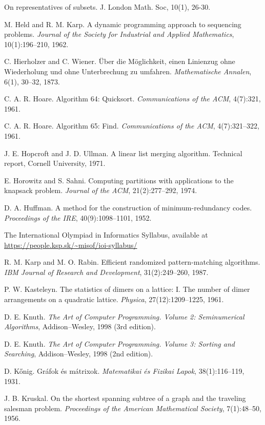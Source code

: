 \begin{thebibliography}{9}
  On representatives of subsets. J. London Math. Soc, 10(1), 26-30.

  M. Held and R. M. Karp.
  A dynamic programming approach to sequencing problems.
  \emph{Journal of the Society for Industrial and Applied Mathematics}, 10(1):196--210, 1962.

  C. Hierholzer and C. Wiener.
  Über die Möglichkeit, einen Linienzug ohne Wiederholung und ohne Unterbrechung zu umfahren.
  \emph{Mathematische Annalen}, 6(1), 30--32, 1873.

  C. A. R. Hoare.
  Algorithm 64: Quicksort.
  \emph{Communications of the ACM}, 4(7):321, 1961.

  C. A. R. Hoare.
  Algorithm 65: Find.
  \emph{Communications of the ACM}, 4(7):321--322, 1961.

  J. E. Hopcroft and J. D. Ullman.
  A linear list merging algorithm.
  Technical report, Cornell University, 1971.

  E. Horowitz and S. Sahni.
  Computing partitions with applications to the knapsack problem.
  \emph{Journal of the ACM}, 21(2):277--292, 1974.

  D. A. Huffman.
  A method for the construction of minimum-redundancy codes.
  \emph{Proceedings of the IRE}, 40(9):1098--1101, 1952.

  The International Olympiad in Informatics Syllabus, available at
  \url{https://people.ksp.sk/~misof/ioi-syllabus/}

  R. M. Karp and M. O. Rabin.
  Efficient randomized pattern-matching algorithms.
  \emph{IBM Journal of Research and Development}, 31(2):249--260, 1987.

  P. W. Kasteleyn.  
  The statistics of dimers on a lattice: I. The number of dimer arrangements on a quadratic lattice.
  \emph{Physica}, 27(12):1209--1225, 1961.

  D. E. Knuth.
  \emph{The Art of Computer Programming. Volume 2: Seminumerical Algorithms}, Addison–Wesley, 1998 (3rd edition).

  D. E. Knuth.
  \emph{The Art of Computer Programming. Volume 3: Sorting and Searching}, Addison–Wesley, 1998 (2nd edition).

  D. Kőnig.
  Gráfok és mátrixok.
  \emph{Matematikai és Fizikai Lapok}, 38(1):116--119, 1931.

  J. B. Kruskal.
  On the shortest spanning subtree of a graph and the traveling salesman problem.
  \emph{Proceedings of the American Mathematical Society}, 7(1):48--50, 1956.


\end{thebibliography}
